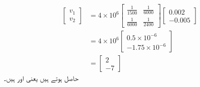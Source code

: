 \begin{align*}
\begin{bmatrix}
v_1\\
v_2
\end{bmatrix}
&=
4\times 10^{6}
\begin{bmatrix}
\frac{1}{1500}& \frac{1}{6000}\\[6pt]
\frac{1}{6000}& \frac{1}{2400}
\end{bmatrix}
\begin{bmatrix}
0.002\\[6pt]
-0.005
\end{bmatrix}\\
&=
4 \times 10^{6}
\begin{bmatrix}
0.5\times 10^{-6}\\[6pt]
-1.75\times 10^{-6}
\end{bmatrix}\\
&=
\begin{bmatrix}
2 \\
-7
\end{bmatrix}
\end{align*}
حاصل ہوتے ہیں یعنی  اور  ہیں۔

